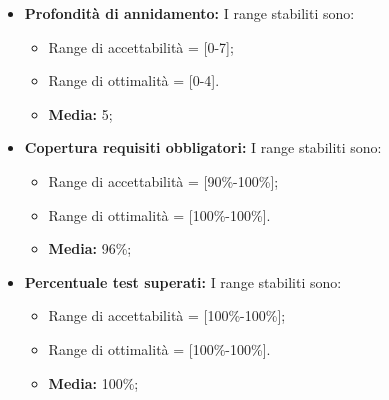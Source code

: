 \begin{itemize}
		\item \textbf{Profondità di annidamento: }I range stabiliti sono:
      \begin{itemize}
        \item Range di accettabilità = [0-7];
        \item Range di ottimalità = [0-4].
        \item \textbf{Media: }5;
      \end{itemize}      
      
      
      \item \textbf{Copertura requisiti obbligatori: }I range stabiliti sono:
      \begin{itemize}
        \item Range di accettabilità = [90\%-100\%];
        \item Range di ottimalità = [100\%-100\%].
        \item \textbf{Media: }96\%;
      \end{itemize}
      
\item \textbf{Percentuale test superati: }I range stabiliti sono:
      \begin{itemize}
        \item Range di accettabilità = [100\%-100\%];
        \item Range di ottimalità = [100\%-100\%].
        \item \textbf{Media: }100\%;
      \end{itemize}

\end{itemize}